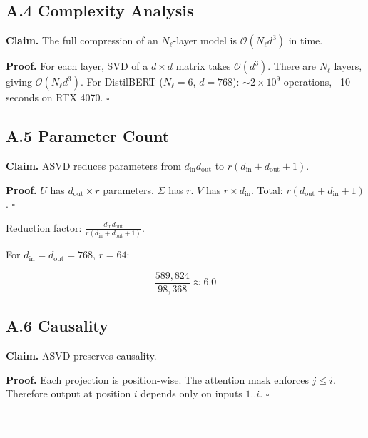 \subsection{A.4 Complexity Analysis}

\textbf{Claim.} The full compression of an $N_\ell$-layer model is 
$\mathcal{O}(N_\ell d^3)$ in time.

\textbf{Proof.} For each layer, SVD of a $d \times d$ matrix takes 
$\mathcal{O}(d^3)$. There are $N_\ell$ layers, giving $\mathcal{O}(N_\ell d^3)$. 
For DistilBERT ($N_\ell = 6$, $d = 768$): $\sim 2 \times 10^9$ operations, 
~10 seconds on RTX 4070. $\square$

\subsection{A.5 Parameter Count}

\textbf{Claim.} ASVD reduces parameters from $d_\text{in} d_\text{out}$ to 
$r(d_\text{in} + d_\text{out} + 1)$.

\textbf{Proof.} $U$ has $d_\text{out} \times r$ parameters. $\Sigma$ has $r$. 
$V$ has $r \times d_\text{in}$. Total: $r(d_\text{out} + d_\text{in} + 1)$. $\square$

Reduction factor: $\frac{d_\text{in} d_\text{out}}{r(d_\text{in} + d_\text{out} + 1)}$.

For $d_\text{in} = d_\text{out} = 768$, $r = 64$:

\[
\frac{589,824}{98,368} \approx 6.0
\]

\subsection{A.6 Causality}

\textbf{Claim.} ASVD preserves causality.

\textbf{Proof.} Each projection is position-wise. The attention mask enforces 
$j \leq i$. Therefore output at position $i$ depends only on inputs 
$1..i$. $\square$
\begin{lstlisting}

---
\end{lstlisting}